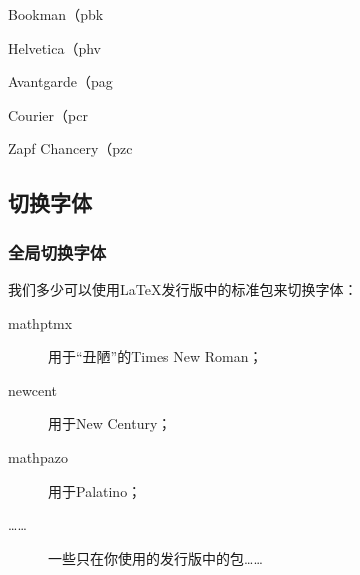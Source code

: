   \begin{decritfonte}{Bookman（}{pbk}
  \end{decritfonte}

  \begin{decritfonte}{Helvetica（}{phv}
  \end{decritfonte}
  
  \begin{decritfonte}{Avantgarde（}{pag}
  \end{decritfonte}
  
  \begin{decritfonte}{Courier（}{pcr}
  \end{decritfonte}
  
  \begin{decritfonte}{Zapf Chancery（}{pzc}
  \end{decritfonte}

  \subsection{切换字体}

  \subsubsection{全局切换字体}

  我们多少可以使用\LaTeX 发行版中的标准包来切换字体：

  \begin{description}
    \item[\textsf{mathptmx}] 用于“丑陋”的Times New Roman；
    \item[\textsf{newcent}] 用于New Century；
    \item[\textsf{mathpazo}] 用于Palatino；
    \item[……] 一些只在你使用的发行版中的包……
  \end{description}

